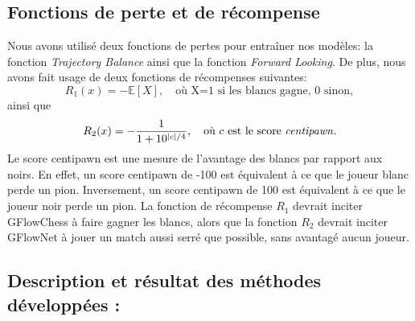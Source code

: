 \documentclass[11pt]{article}
\begin{document}
\subsection*{Fonctions de perte et de récompense}
Nous avons utilisé deux fonctions de pertes pour entraîner nos
modèles: la fonction \textit{Trajectory Balance} ainsi que la fonction
\textit{Forward Looking}. De plus, nous avons fait usage de deux
fonctions de récompenses suivantes:
\begin{equation*}
  R_{1}(x) = - \mathbb{E}[X], \quad \text{où X=1 si les blancs gagne, 0 sinon},
\end{equation*} ainsi que
\begin{equation*}
  R_{2}(x) = - \frac{1}{1+10^{|c|/4}}, \quad \text{où $c$ est le score \textit{centipawn}}.
\end{equation*}Le score centipawn est une mesure de l'avantage des
blancs par rapport aux noirs. En effet, un score centipawn de -100 est
équivalent à ce que le joueur blanc perde un pion. Inversement, un
score centipawn de 100 est équivalent à ce que le joueur noir perde un
pion. La fonction de récompense $R_{1}$ devrait inciter GFlowChess à
faire gagner les blancs, alors que la fonction $R_{2}$ devrait inciter
GFlowNet à jouer un match aussi serré que possible, sans avantagé
aucun joueur.


\subsection*{Description et résultat des méthodes développées :}




\end{document}
